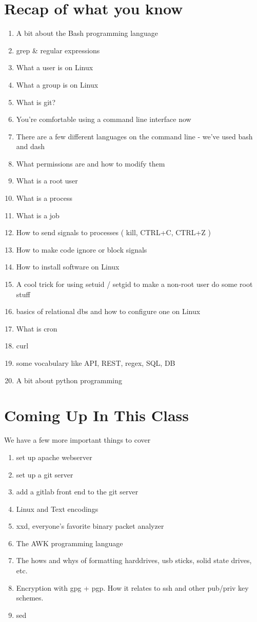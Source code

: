 \documentclass[10pt]{article}
\begin{document}
\section{Recap of what you know}
\begin{enumerate}
\item A bit about the Bash programming language
\item grep \& regular expressions
\item What a user is on Linux
\item What a group is on Linux
\item What is git?
\item You're comfortable using a command line interface now
\item There are a few different languages on the command line - we've used bash and dash
\item What permissions are and how to modify them
\item What is a root user
\item What is a process
\item What is a job
\item How to send signals to processes ( kill, CTRL+C, CTRL+Z )
\item How to make code ignore or block signals
\item How to install software on Linux
\item A cool trick for using setuid / setgid to make a non-root user do some root stuff
\item basics of relational dbs and how to configure one on Linux
\item What is cron
\item curl
\item some vocabulary like API, REST, regex, SQL, DB
\item A bit about python programming
\end{enumerate}

\section{Coming Up In This Class}

We have a few more important things to cover
\begin{enumerate}
\item set up apache webserver
\item set up a git server
\item add a gitlab front end to the git server
\item Linux and Text encodings
\item xxd, everyone's favorite binary packet analyzer
\item The AWK programming language
\item The hows and whys of formatting harddrives, usb sticks, solid state drives, etc.
\item Encryption with gpg + pgp. How it relates to ssh and other pub/priv key schemes.
\item sed
\end{enumerate}
\end{document}
